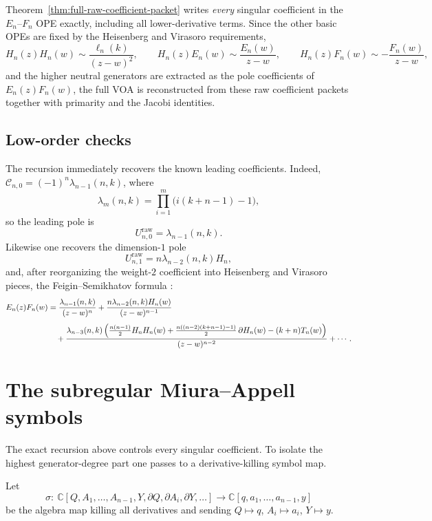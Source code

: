 \begin{remark}
Theorem~\ref{thm:full-raw-coefficient-packet} writes \emph{every} singular
coefficient in the $E_n$--$F_n$ OPE exactly, including all lower-derivative
terms.  Since the other basic OPEs are fixed by the Heisenberg and Virasoro
requirements,
\[
H_n(z)H_n(w)\sim \frac{\ell_n(k)}{(z-w)^2},
\qquad
H_n(z)E_n(w)\sim \frac{E_n(w)}{z-w},
\qquad
H_n(z)F_n(w)\sim -\frac{F_n(w)}{z-w},
\]
and the higher neutral generators are extracted as the pole coefficients of
$E_n(z)F_n(w)$, the full VOA is reconstructed from these raw coefficient
packets together with primarity and the Jacobi identities.
\end{remark}

\subsection{Low-order checks}

The recursion immediately recovers the known leading coefficients.  Indeed,
$\mathcal C_{n,0}=(-1)^n\lambda_{n-1}(n,k)$, where
\[
\lambda_m(n,k)=\prod_{i=1}^{m}\bigl(i(k+n-1)-1\bigr),
\]
so the leading pole is
\[
U_{n,0}^{\mathrm{raw}}=\lambda_{n-1}(n,k).
\]
Likewise one recovers the dimension-$1$ pole
\[
U_{n,1}^{\mathrm{raw}}=n\lambda_{n-2}(n,k)H_n,
\]
and, after reorganizing the weight-$2$ coefficient into Heisenberg and Virasoro
pieces, the Feigin--Semikhatov formula
\cite[(A.1)]{FeiginSemikhatov}:
\begin{align}
E_n(z)F_n(w)
&=
\frac{\lambda_{n-1}(n,k)}{(z-w)^n}
+
\frac{n\lambda_{n-2}(n,k)H_n(w)}{(z-w)^{n-1}}
\notag\\[4pt]
&\quad
+\frac{\lambda_{n-3}(n,k)\left(\frac{n(n-1)}2 H_nH_n(w)
+\frac{n((n-2)(k+n-1)-1)}2\,\partial H_n(w)
-(k+n)T_n(w)\right)}{(z-w)^{n-2}}
+\cdots.
\label{eq:fs-pole-two}
\end{align}

\section{The subregular Miura--Appell symbols}

The exact recursion above controls every singular coefficient.  To isolate the
highest generator-degree part one passes to a derivative-killing symbol map.

\begin{definition}
\label{def:derivative-killing-symbol}
Let
\[
\sigma:\ \mathbb C[Q,A_1,\dots,A_{n-1},Y,\partial Q,\partial A_i,\partial Y,\dots]
\longrightarrow
\mathbb C[q,a_1,\dots,a_{n-1},y]
\]
be the algebra map killing all derivatives and sending
$Q\mapsto q$, $A_i\mapsto a_i$, $Y\mapsto y$.
\end{definition}

